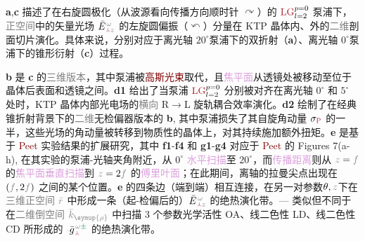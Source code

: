 \textbf{a},\textbf{c} 描述了在\textcolor{NavyBlue}{右旋圆极化}（从\textcolor{NavyBlue}{波源}看向传播方向顺时针 $\curvearrowright$）的 $\textcolor{Maroon}{\text{LG}}^{p=0}_{l=2}$ \textcolor{NavyBlue}{泵浦}下，\textcolor{gray}{正空间}中的\textcolor{PineGreen}{矢量光场} $\bar{E}^{\;\!\mathcolor{gray}{\omega}}_{\;\! \textcolor{Maroon}{\Yup} \mathcolor{gray}{z}}$ 的\textcolor{NavyBlue}{左旋圆偏振}（$\curvearrowleft$）分量在 KTP 晶体内、外的\textcolor{gray}{二维}剖面切片演化。具体来说，分别对应于离\textcolor{PineGreen}{光轴} $20^\circ$泵浦下的\textcolor{PineGreen}{双折射}（\textbf{a}）、离\textcolor{PineGreen}{光轴} $0^\circ$泵浦下的\textcolor{PineGreen}{锥形衍射}（\textbf{c}）过程。

\textbf{b} 是 \textbf{c} 的\textcolor{gray}{三维版本}，其中\textcolor{NavyBlue}{泵浦}被\textcolor{Maroon}{高斯光束}取代，且\textcolor{Plum}{焦平面}从透镜处被移动至位于晶体后表面和透镜之间。\textbf{d1} 给出了当\textcolor{NavyBlue}{泵浦} $\textcolor{Maroon}{\text{LG}}^{p=0}_{l=2}$ 分别被对齐在离\textcolor{PineGreen}{光轴} $0^\circ$ 和 $5^\circ$ 处时，KTP 晶体内部\textcolor{PineGreen}{光电场}的\textcolor{gray}{横向} R$\to$L \textcolor{NavyBlue}{旋轨耦合}效率演化。\textbf{d2} 绘制了在经典\textcolor{PineGreen}{锥折射}背景下的\textcolor{gray}{二维}\textcolor{PineGreen}{无检偏器}版本的 \textbf{b}, 其中\textcolor{NavyBlue}{泵浦}损失了其\textcolor{NavyBlue}{自旋角动量} $\sigma_{\textcolor{Maroon}{\text{P}}}$ 的一半，这些光场的\textcolor{NavyBlue}{角动量}被转移到物质性的晶体上，对其持续施加\textcolor{NavyBlue}{额外扭矩}\cite{berryOrbitalSpinAngular2005}。\textbf{e} 是基于 \textcolor{Maroon}{Peet} 实验结果的扩展研究，其中 \textbf{f1}-\textbf{f4} 和 \textbf{g1}-\textbf{g4} 对应于 \textcolor{Maroon}{Peet} 的 Figures 7(a-h)\cite{peetExperimentalStudyInternal2014}, 在其实验的\textcolor{NavyBlue}{泵浦}-\textcolor{PineGreen}{光轴}夹角附近，从 $0^\circ$ \textcolor{Plum}{水平扫描}至 $20^\circ$，而\textcolor{Plum}{传播距离}则从 $\mathcolor{gray}{z}=\mathcolor{gray}{f}$ 的\textcolor{Plum}{焦平面}\textcolor{Plum}{垂直扫描}到 $\mathcolor{gray}{z}=2\mathcolor{gray}{f}$ 的\textcolor{Plum}{傅里叶面}；在此期间，\textcolor{PineGreen}{离轴}的\textcolor{PineGreen}{拉曼尖点}出现在 $(\mathcolor{gray}{f},2\mathcolor{gray}{f})$ 之间的某个位置。\textbf{e} 的四条边（端到端）相互连接，在另一对参数$\theta,\mathcolor{gray}{z}$下在\textcolor{gray}{三维}\textcolor{gray}{正空间} $\mathcolor{gray}{\bar{r}}$ 中形成一条（\textcolor{PineGreen}{起-检偏}后的）$\bar{E}^{\;\!\mathcolor{gray}{\omega}}_{\;\! \textcolor{Maroon}{\Yup} \mathcolor{gray}{z}}$ 的\textcolor{NavyBlue}{绝热演化}带。--- 类似但不同于  在\textcolor{gray}{二维}\textcolor{gray}{倒空间} $\mathcolor{gray}{\bar{k}_{\symup{\rho}}}$ 中扫描 3 个参数\textcolor{NavyBlue}{光学活性 OA}、\textcolor{NavyBlue}{线二色性 LD}、\textcolor{NavyBlue}{线二色性 CD} 所形成的 $\xint{{}^{}_{\mathcolor{gray}{-}}}{10}{\bar{g}}^{\;\!\mathcolor{gray}{\omega} \textcolor{PineGreen}{\pm}}_{\;\! \textcolor{Maroon}{\Yup}}$ 的\textcolor{NavyBlue}{绝热演化}带。

